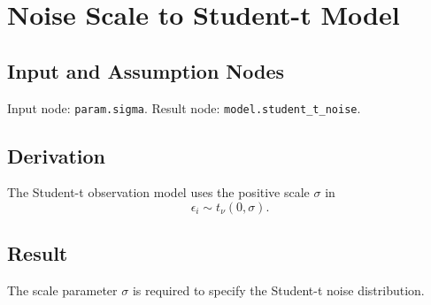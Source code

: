 \section{Noise Scale to Student-t Model}
\label{edge:sigma-to-student-t-model}

\subsection{Input and Assumption Nodes}
Input node: \texttt{param.sigma}. Result node: \texttt{model.student\_t\_noise}.

\subsection{Derivation}
The Student-t observation model uses the positive scale \(\sigma\) in
\[
  \epsilon_i \sim t_\nu(0,\sigma).
\]

\subsection{Result}
The scale parameter \(\sigma\) is required to specify the Student-t noise distribution.
